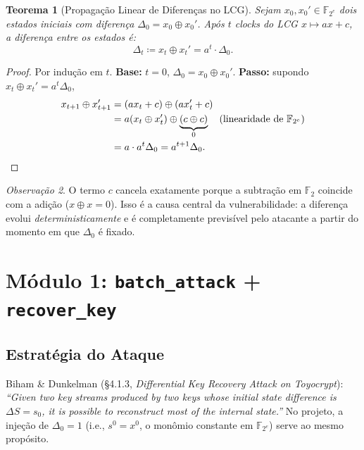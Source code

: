 \documentclass[12pt,a4paper]{article}
\newtheorem{theorem}{Teorema}[section]
\theoremstyle{definition}
\theoremstyle{remark}
\newtheorem{remark}[theorem]{Observação}
\newcommand{\GF}[1]{\mathbb{F}_{2^{#1}}}
\newcommand{\GFtwo}{\mathbb{F}_2}
\newcommand{\xor}{\oplus}
\begin{document}
\begin{theorem}[Propagação Linear de Diferenças no LCG]
  \label{thm:linear-prop}
  Sejam $x_0, x_0' \in \GF{e}$ dois estados iniciais com diferença
  $\Delta_0 = x_0 \xor x_0'$. Após $t$ clocks do LCG $x \mapsto ax+c$,
  a diferença entre os estados é:
  \[
    \Delta_t \coloneqq x_t \xor x_t' = a^t \cdot \Delta_0.
  \]
\end{theorem}

\begin{proof}
  Por indução em $t$. \textbf{Base:} $t=0$, $\Delta_0 = x_0 \xor x_0'$.\;
  \textbf{Passo:} supondo $x_t \xor x_t' = a^t \Delta_0$,
  \begin{align*}
    x_{t+1} \xor x_{t+1}' &= (a x_t + c) \xor (a x_t' + c) \\
                           &= a(x_t \xor x_t') \xor \underbrace{(c \xor c)}_{0}
                              \quad \text{(linearidade de } \GF{e}\text{)} \\
                           &= a \cdot a^t \Delta_0 = a^{t+1} \Delta_0. \qedhere
  \end{align*}
\end{proof}

\begin{remark}
  O termo $c$ cancela exatamente porque a subtração em $\GFtwo$ coincide com
  a adição ($x \xor x = 0$). Isso é a causa central da vulnerabilidade: a
  diferença evolui \emph{deterministicamente} e é completamente previsível pelo
  atacante a partir do momento em que $\Delta_0$ é fixado.
\end{remark}

\section{Módulo 1: \texttt{batch\_attack} + \texttt{recover\_key}}
\label{sec:batch}

\subsection{Estratégia do Ataque}

\begin{paperref}
  Biham \& Dunkelman (\S4.1.3, \textit{Differential Key Recovery Attack on
  Toyocrypt}): \textit{``Given two key streams produced by two keys whose
  initial state difference is $\Delta S = s_0$, it is possible to reconstruct
  most of the internal state.''} No projeto, a injeção de $\Delta_0 = 1$
  (i.e., $s^0 = x^0$, o monômio constante em $\GF{e}$) serve ao mesmo
  propósito.
\end{paperref}
\end{document}
